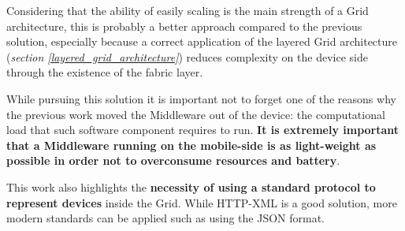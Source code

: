 Considering that the ability of easily scaling is the main strength of a Grid architecture, this is probably a better approach compared to the previous solution, especially because a correct application of the layered Grid architecture (\textit{section \ref{layered_grid_architecture}}) reduces complexity on the device side through the existence of the fabric layer.

While pursuing this solution it is important not to forget one of the reasons why the previous work moved the Middleware out of the device: the computational load that such software component requires to run. \textbf{It is extremely important that a Middleware running on the mobile-side is as light-weight as possible in order not to overconsume resources and battery}.

This work also highlights the \textbf{necessity of using a standard protocol to represent devices} inside the Grid. While HTTP-XML is a good solution, more modern standards can be applied such as using the JSON format.